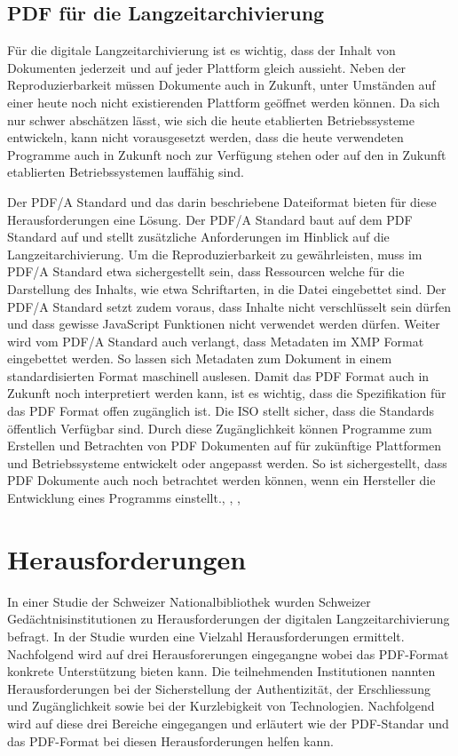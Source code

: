 \documentclass[a4paper,oneside, 12pt]{report}
\begin{document}
\section{PDF für die Langzeitarchivierung}
Für die digitale Langzeitarchivierung ist es wichtig, dass der Inhalt von Dokumenten jederzeit und auf jeder Plattform gleich aussieht. Neben der Reproduzierbarkeit müssen Dokumente auch in Zukunft, unter Umständen auf einer heute noch nicht existierenden Plattform geöffnet werden können. Da sich nur schwer abschätzen lässt, wie sich die heute etablierten Betriebssysteme entwickeln, kann nicht vorausgesetzt werden, dass die heute verwendeten Programme auch in Zukunft noch zur Verfügung stehen oder auf den in Zukunft etablierten Betriebssystemen lauffähig sind.

Der PDF/A Standard und das darin beschriebene Dateiformat bieten für diese Herausforderungen eine Lösung. Der PDF/A Standard baut auf dem PDF Standard auf und stellt zusätzliche Anforderungen im Hinblick auf die Langzeitarchivierung. Um die Reproduzierbarkeit zu gewährleisten, muss im PDF/A Standard etwa sichergestellt sein, dass Ressourcen welche für die Darstellung des Inhalts, wie etwa Schriftarten, in die Datei eingebettet sind. Der PDF/A Standard setzt zudem voraus, dass Inhalte nicht verschlüsselt sein dürfen und dass gewisse JavaScript Funktionen nicht verwendet werden dürfen. Weiter wird vom PDF/A Standard auch verlangt, dass Metadaten im \ac{XMP} Format eingebettet werden. So lassen sich Metadaten zum Dokument in einem standardisierten Format maschinell auslesen. Damit das PDF Format auch in Zukunft noch interpretiert werden kann, ist es wichtig, dass die Spezifikation für das PDF Format offen zugänglich ist. Die \ac{ISO} stellt sicher, dass die Standards öffentlich Verfügbar sind. Durch diese Zugänglichkeit können Programme zum Erstellen und Betrachten von PDF Dokumenten auf für zukünftige Plattformen und Betriebssysteme entwickelt oder angepasst werden. So ist sichergestellt, dass PDF Dokumente auch noch betrachtet werden können, wenn ein Hersteller die Entwicklung eines Programms einstellt.\cite{pdfanutshell}, \cite{Arms2005DigitalFF}, \cite{ISO32000}, \cite{ISO19005}

 
\chapter{Herausforderungen}\label{sec:herausforderungen}
In einer Studie der Schweizer Nationalbibliothek wurden Schweizer Gedächtnisinstitutionen zu Herausforderungen der digitalen Langzeitarchivierung befragt. In der Studie wurden eine Vielzahl Herausforderungen ermittelt. Nachfolgend wird auf drei Herausforerungen eingegangne wobei das PDF-Format konkrete Unterstützung bieten kann. Die teilnehmenden Institutionen nannten Herausforderungen bei der Sicherstellung der Authentizität, der Erschliessung und Zugänglichkeit sowie bei der Kurzlebigkeit von Technologien. Nachfolgend wird auf diese drei Bereiche eingegangen und erläutert wie der PDF-Standar und das PDF-Format bei diesen Herausforderungen helfen kann. \cite{lzaschweiz}
\end{document}
